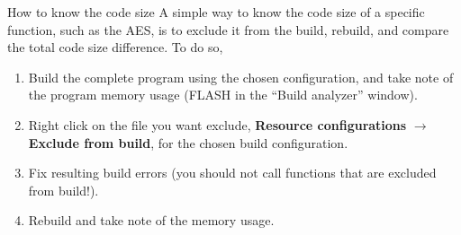 \begin{bclogo}[couleur = gray!20, arrondi = 0.2, logo=\bcinfo]{How to know the code size}
	A simple way to know the code size of a specific function, such as the AES, is
	to exclude it from the build, rebuild, and compare the total code size
	difference. To do so,
	\begin{enumerate}
		\item Build the complete program using the chosen configuration, and take
		note of the program memory usage (FLASH in the ``Build analyzer''
		window).
		\item Right click on the file you want exclude, \textbf{Resource
			configurations} $\rightarrow$ \textbf{Exclude from build}, for the chosen build configuration.
		\item Fix resulting build errors (you should not call functions that are excluded from build!).
		\item Rebuild and take note of the memory usage.
	\end{enumerate}
\end{bclogo}

